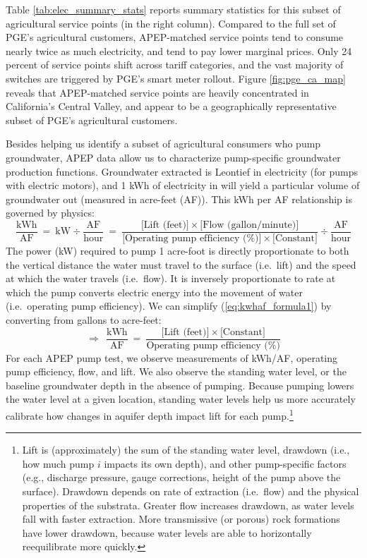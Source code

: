 Table \ref{tab:elec_summary_stats} reports summary statistics for this subset of agricultural service points (in the right column). Compared to the full set of PGE's agricultural customers, APEP-matched service points tend to consume nearly twice as much electricity, and tend to pay lower marginal prices. Only 24 percent of service points shift across tariff categories, and the vast majority of switches are triggered by PGE's smart meter rollout. Figure \ref{fig:pge_ca_map} reveals that APEP-matched service points are heavily concentrated in California's Central Valley, and appear to be a geographically representative subset of PGE's agricultural customers.

Besides helping us identify a subset of agricultural consumers who pump groundwater, APEP data allow us to characterize pump-specific groundwater production functions. Groundwater extracted is Leontief in electricity (for pumps with electric motors), and 1 kWh of electricity in will yield a particular volume of groundwater out (measured in acre-feet (AF)). This kWh per AF relationship is governed by physics:
\begin{equation}
\frac{\text{kWh}}{\text{AF}} ~=~ \text{kW} \div \frac{\text{AF}}{\text{hour}} 
 ~=~ \frac{\big[\text{Lift (feet)} \big]\times \big[\text{Flow (gallon/minute)}\big]}{\big[\text{Operating pump efficiency (\%)}\big] \times \big[\text{Constant}\big]} \div \frac{\text{AF}}{\text{hour}} 
\label{eq:kwhaf_formula1}
\end{equation}
The power (kW) required to pump 1 acre-foot is directly proportionate to both the vertical distance the water must travel to the surface (i.e.\ lift) and the speed at which the water travels (i.e.\ flow). It is inversely proportionate to rate at which the pump converts electric energy into the movement of water (i.e.\ operating pump efficiency). We can simplify (\ref{eq:kwhaf_formula1}) by converting from gallons to acre-feet: 
\begin{equation}
\Rightarrow~~\frac{\text{kWh}}{\text{AF}} ~=~ \frac{\big[\text{Lift (feet)} \big] \times \big[\text{Constant}\big]}{\text{Operating pump efficiency (\%)}} 
\label{eq:kwhaf_formula2}
\end{equation}
For each APEP pump test, we observe measurements of kWh/AF, operating pump efficiency, flow, and lift. We also observe the standing water level, or the baseline groundwater depth in the absence of pumping. Because pumping lowers the water level at a given location, standing water levels help us more accurately calibrate how changes in aquifer depth impact lift for each pump.\footnote{
Lift is (approximately) the sum of the standing water level, drawdown (i.e., how much pump $i$ impacts its own depth), and other pump-specific factors (e.g., discharge pressure, gauge corrections, height of the pump above the surface).
Drawdown depends on rate of extraction (i.e.\ flow) and the physical properties of the substrata. Greater flow increases drawdown, as water levels fall with faster extraction. More transmissive (or porous) rock formations have lower drawdown, because water levels are able to horizontally reequilibrate  more quickly.
}


